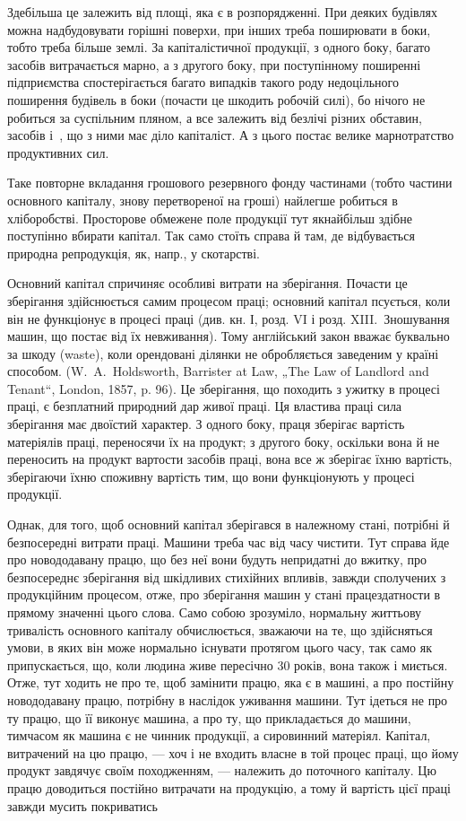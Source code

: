 
Здебільша це залежить від площі, яка є в розпорядженні. При деяких будівлях можна надбудовувати
горішні поверхи, при інших треба поширювати в боки, тобто треба більше землі. За капіталістичної
продукції, з одного боку, багато засобів витрачається марно, а з другого боку, при поступінному
поширенні підприємства спостерігається багато випадків такого роду недоцільного поширення будівель в
боки (почасти це шкодить робочій силі), бо нічого не робиться за суспільним пляном, а все залежить
від безлічі різних обставин, засобів і~, що з ними має діло капіталіст. А з цього постає
велике марнотратство продуктивних сил.

Таке повторне вкладання грошового резервного фонду частинами (тобто частини основного капіталу,
знову перетвореної на гроші) найлегше робиться в хліборобстві. Просторове обмежене поле продукції
тут якнайбільш здібне поступінно вбирати капітал. Так само стоїть справа й там, де відбувається
природна репродукція, як, напр., у скотарстві.

Основний капітал спричиняє особливі витрати на зберігання. Почасти це зберігання здійснюється самим
процесом праці; основний капітал псується, коли він не функціонує в процесі праці (див. кн. І, розд.
VI і розд. XIII.~Зношування машин, що постає від їх невживання). Тому англійський закон вважає
буквально за шкоду (waste), коли орендовані ділянки не обробляється заведеним у країні способом. (W.~A.~Holdsworth, Barrister at Law, „The Law of Landlord and Tenant“, London, 1857, p. 96). Це
зберігання, що походить з ужитку в процесі праці, є безплатний природний дар живої праці. Ця
властива праці сила зберігання має двоїстий характер. З одного боку, праця зберігає вартість
матеріялів праці, переносячи їх на продукт; з другого боку, оскільки вона й не переносить на продукт
вартости засобів праці, вона все ж зберігає їхню вартість, зберігаючи їхню споживну вартість тим, що
вони функціонують у процесі продукції.

Однак, для того, щоб основний капітал зберігався в належному стані, потрібні й безпосередні витрати
праці. Машини треба час від часу чистити. Тут справа йде про новододавану працю, що без неї вони
будуть непридатні до вжитку, про безпосереднє зберігання від шкідливих стихійних впливів, завжди
сполучених з продукційним процесом, отже, про зберігання машин у стані працездатности в прямому
значенні цього слова. Само собою зрозуміло, нормальну життьову тривалість основного капіталу
обчислюється, зважаючи на те, що здійсняться умови, в яких він може нормально існувати протягом
цього часу, так само як припускається, що, коли людина живе пересічно 30 років, вона також і
миється. Отже, тут ходить не про те, щоб замінити працю, яка є в машині, а про постійну новододавану
працю, потрібну в наслідок уживання машини. Тут ідеться не про ту працю, що її виконує машина, а про
ту, що прикладається до машини, тимчасом як машина є не чинник продукції, а сировинний
матеріял. Капітал, витрачений на цю працю, — хоч і не входить власне в той процес праці, що йому
продукт завдячує своїм походженням, — належить до поточного капіталу. Цю працю доводиться постійно
витрачати на продукцію, а тому й вартість цієї праці завжди мусить покриватись
\parbreak{}  %
